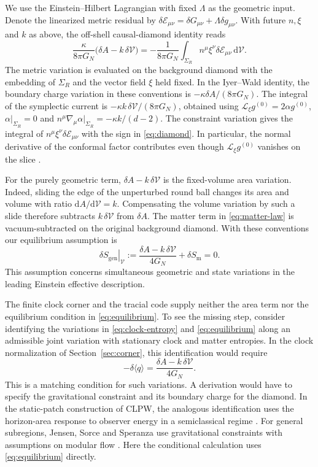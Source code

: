 \documentclass[11pt,a4paper]{article}
\numberwithin{equation}{section}
\theoremstyle{remark}
\newcommand{\dd}{\mathrm d}
\newcommand{\Sgen}{S_{\mathrm{gen}}}
\newcommand{\Smat}{S_{\mathrm{m}}}
\newcommand{\GN}{G_N}
\newcommand{\Vol}{\mathcal V}
\newcommand{\EE}{\mathcal E}
\begin{document}
We use the Einstein--Hilbert Lagrangian with fixed $\Lambda$ as the geometric input. Denote the linearized metric residual by
$\delta\EE_{\mu\nu}=\delta G_{\mu\nu}+\Lambda\delta g_{\mu\nu}$.
With future $n,\xi$ and $k$ as above, the off-shell causal-diamond identity reads
\begin{equation}
 \frac{\kappa}{8\pi\GN}\bigl(\delta A-k\,\delta\Vol\bigr)
 =-\frac{1}{8\pi\GN}\int_{\Sigma_R}
               n^\mu\xi^\nu\delta\EE_{\mu\nu}\,\dd\Vol .
 \label{eq:diamond}
\end{equation}
The metric variation is evaluated on the background diamond with the embedding of $\Sigma_R$ and the vector field $\xi$ held fixed. In the Iyer--Wald identity, the boundary charge variation in these conventions is $-\kappa\delta A/(8\pi\GN)$. The integral of the symplectic current is $-\kappa k\,\delta\Vol/(8\pi\GN)$, obtained using $\mathcal L_\xi g^{(0)}=2\alpha g^{(0)}$, $\alpha|_{\Sigma_R}=0$ and $n^\mu\nabla_\mu\alpha|_{\Sigma_R}=-\kappa k/(d-2)$. The constraint variation gives the integral of $n^\mu\xi^\nu\delta\EE_{\mu\nu}$ with the sign in \eqref{eq:diamond}. In particular, the normal derivative of the conformal factor contributes even though $\mathcal L_\xi g^{(0)}$ vanishes on the slice \cite{Iyer1994,Bueno2017,JacobsonVisser2019}.

For the purely geometric term, $\delta A-k\,\delta\Vol$ is the fixed-volume area variation. Indeed, sliding the edge of the unperturbed round ball changes its area and volume with ratio $\dd A/\dd\Vol=k$. Compensating the volume variation by such a slide therefore subtracts $k\,\delta\Vol$ from $\delta A$. The matter term in \eqref{eq:matter-law} is vacuum-subtracted on the original background diamond. With these conventions our equilibrium assumption is
\begin{equation}
 \left.\delta\Sgen\right|_{\Vol}
  :=\frac{\delta A-k\,\delta\Vol}{4\GN}+\delta\Smat=0 .
 \label{eq:equilibrium}
\end{equation}
This assumption concerns simultaneous geometric and state variations in the leading Einstein effective description.

The finite clock corner and the tracial code supply neither the area term nor the equilibrium condition in \eqref{eq:equilibrium}. To see the missing step, consider identifying the variations in \eqref{eq:clock-entropy} and \eqref{eq:equilibrium} along an admissible joint variation with stationary clock and matter entropies. In the clock normalization of Section~\ref{sec:corner}, this identification would require
\[
 -\delta\langle q\rangle=\frac{\delta A-k\,\delta\Vol}{4\GN}.
\]
This is a matching condition for such variations. A derivation would have to specify the gravitational constraint and its boundary charge for the diamond. In the static-patch construction of CLPW, the analogous identification uses the horizon-area response to observer energy in a semiclassical regime \cite[Sec.~3.2]{CLPW2022}. For general subregions, Jensen, Sorce and Speranza use gravitational constraints with assumptions on modular flow \cite{Jensen2023}. Here the conditional calculation uses \eqref{eq:equilibrium} directly.
\end{document}
